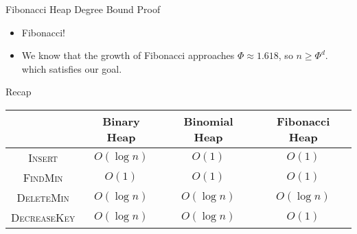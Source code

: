 \documentclass[aspectratio=169]{beamer}
\begin{document}
\begin{frame}{Fibonacci Heap Degree Bound Proof}
    \begin{itemize}
        \item Fibonacci!
            \begin{center}
            \end{center}\pause
        \item We know that the growth of Fibonacci approaches $\Phi \approx 1.618$, so $n \ge \Phi^d$. which satisfies our goal.
    \end{itemize}
\end{frame}


\begin{frame}{Recap}
    \begin{center}
        \begin{tabular}{|c|c|c|c|}
            \hline
            & Binary Heap & Binomial Heap & Fibonacci Heap\\
            \hline
            \textsc{Insert} & \textcolor{sigma@mainblue}{$O(\log n )$} & \textcolor{sigma@mainblue}{$O(1)$} & \textcolor{sigma@mainblue}{$O(1)$} \\
            \textsc{FindMin} & \textcolor{sigma@mainblue}{$O(1)$} & \textcolor{sigma@mainblue}{$O(1)$} & \textcolor{sigma@mainblue}{$O(1)$} \\
            \textsc{DeleteMin} & \textcolor{sigma@mainblue}{$O(\log n )$} & \textcolor{sigma@mainblue}{$O(\log n )$} & \textcolor{sigma@mainblue}{$O(\log n )$} \\
            \textsc{DecreaseKey} & \textcolor{sigma@mainblue}{$O(\log n )$}& \textcolor{sigma@mainblue}{$O(\log n )$} & \textcolor{sigma@mainblue}{$O(1)$} \\
            \hline
        \end{tabular}
    \end{center}
\end{frame}
\end{document}
